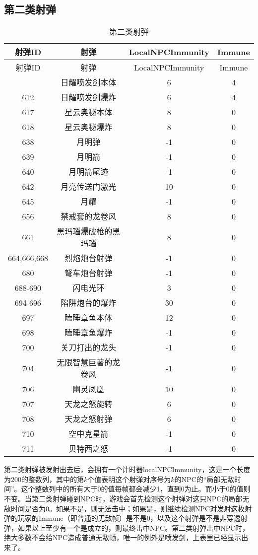 \subsection{第二类射弹}
\begin{longtable}{|c|c|c|c|}
\caption{第二类射弹}\\ \hline
射弹ID & 射弹 & LocalNPCImmunity & Immune\\\hline
\endfirsthead
\hline 射弹ID & 射弹 & LocalNPCImmunity & Immune\\\hline
\endhead
\hline
\endfoot
611 & 日耀喷发剑本体 & 6 & 4 \\ \hline
612 & 日耀喷发剑爆炸 & 6 & 4 \\ \hline
617 & 星云奥秘本体 & 8 & 0 \\ \hline
618 & 星云奥秘爆炸 & 8 & 0 \\ \hline
638 & 月明弹 & -1 & 0 \\ \hline
639 & 月明箭 & -1 & 0 \\ \hline
640 & 月明箭尾迹 & -1 & 0 \\ \hline
642 & 月亮传送门激光 & 10 & 0 \\ \hline
645 & 月耀 & -1 & 0 \\ \hline
656 & 禁戒套的龙卷风 & 8 & 0 \\ \hline
661 & 黑玛瑙爆破枪的黑玛瑙 & 8 & 0 \\ \hline
664,666,668 & 烈焰炮台射弹 & -1 & 0 \\ \hline
680 & 弩车炮台射弹 & -1 & 0 \\ \hline
688-690 & 闪电光环 & 3 & 0 \\ \hline
694-696 & 陷阱炮台的爆炸 & 30 & 0 \\ \hline
697 & 瞌睡章鱼本体 & 12 & 0 \\ \hline
698 & 瞌睡章鱼爆炸 & -1 & 0 \\ \hline
700 & 关刀打出的龙头 & -1 & 0 \\ \hline
704 & 无限智慧巨著的龙卷风 & -1 & 0 \\ \hline
706 & 幽灵凤凰 & 10 & 0 \\ \hline
707 & 天龙之怒旋转 & 6 & 0 \\ \hline
708 & 天龙之怒射弹 & 6 & 0 \\ \hline
710 & 空中克星箭 & -1 & 0 \\ \hline
711 & 贝特西之怒 & -1 & 0
\end{longtable}

第二类射弹被发射出去后，会拥有一个计时器localNPCImmunity，这是一个长度为200的整数列，其中的第$k$个值表明这个射弹对序号为$k$的NPC的“局部无敌时间”。这个整数列中的所有大于0的值每帧都会减少1，直到0为止。而小于0的值则不变。当第二类射弹碰到NPC时，游戏会首先检测这个射弹对这只NPC的局部无敌时间是否为0。如果不是，则无法击中；如果是，则继续检测NPC对发射这枚射弹的玩家的Immune（即普通的无敌帧）是不是0，以及这个射弹是不是非穿透射弹，如果以上至少有一个是成立的，则最终击中NPC。第二类射弹击中NPC时，绝大多数不会给NPC造成普通无敌帧，唯一的例外是喷发剑，上表里已经显示出来了。

